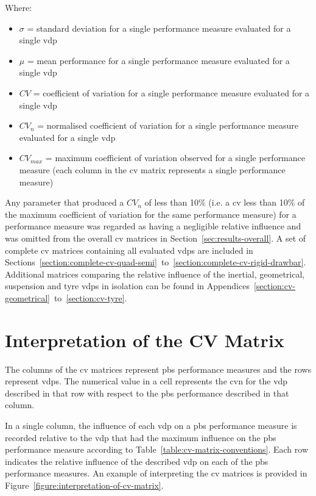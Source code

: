 Where:
\begin{itemize}[label={}]
\item $\sigma$ = standard deviation for a single performance measure evaluated for a single \gls{vdp}
\item $\mu$ = mean performance for a single performance measure evaluated for a single \gls{vdp}
\item $CV$ = coefficient of variation for a single performance measure evaluated for a single \gls{vdp}
\item $CV_n$ = normalised coefficient of variation for a single performance measure evaluated for a single \gls{vdp}
\item $CV_{max}$ = maximum coefficient of variation observed for a single performance measure (each column in the \gls{cv} matrix represents a single performance measure)
\end{itemize}

Any parameter that produced a $CV_n$ of less than 10\% (i.e. a \gls{cv} less than 10\% of the maximum coefficient of variation for the same performance measure) for a performance measure was regarded as having a negligible relative influence and was omitted from the overall \gls{cv} matrices in Section~\ref{sec:results-overall}. A set of complete \gls{cv} matrices containing all evaluated \glspl{vdp} are included in Sections~\ref{section:complete-cv-quad-semi}~to~\ref{section:complete-cv-rigid-drawbar}. Additional matrices comparing the relative influence of the inertial, geometrical, suspension and tyre \glspl{vdp} in isolation can be found in Appendices~\ref{section:cv-geometrical}~to~\ref{section:cv-tyre}.

\section{Interpretation of the CV Matrix}\label{section:interpretation-of-the-results-matrix}

The columns of the \gls{cv} matrices represent \gls{pbs} performance measures and the rows represent \glspl{vdp}. The numerical value in a cell represents the \gls{cvn} for the \gls{vdp} described in that row with respect to the \gls{pbs} performance described in that column.

In a single column, the influence of each \gls{vdp} on a \gls{pbs} performance measure is recorded relative to the \gls{vdp} that had the maximum influence on the \gls{pbs} performance measure according to Table~\ref{table:cv-matrix-conventions}. Each row indicates the relative influence of the described \gls{vdp} on each of the \gls{pbs} performance measures. An example of interpreting the \gls{cv} matrices is provided in Figure~\ref{figure:interpretation-of-cv-matrix}.

